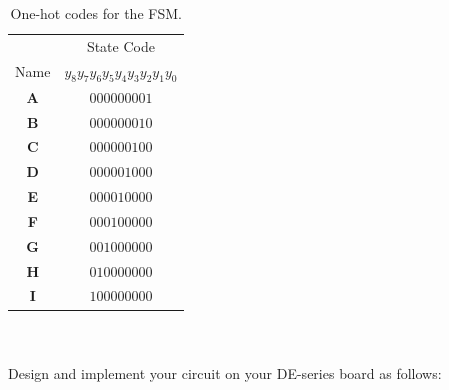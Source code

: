 \documentclass[epsfig,10pt,fullpage]{article}
\begin{document}
\begin{table}[H]
\begin{center}
\begin{tabular}{c|c}
~ & State Code \\ 
Name & $y_8 y_7 y_6 y_5 y_4 y_3 y_2 y_1 y_0$ \\ \hline
\rule[-0.075in]{0in}{0.25in}{\bf A} & $000000001$ \\ 
{\bf B} & $000000010$ \\ 
{\bf C} & $000000100$ \\ 
{\bf D} & $000001000$ \\ 
{\bf E} & $000010000$ \\ 
{\bf F} & $000100000$ \\ 
{\bf G} & $001000000$ \\ 
{\bf H} & $010000000$ \\ 
{\bf I} & $100000000$ \\ 
\end{tabular}
\end{center}
\caption{One-hot codes for the FSM.}
\label{tab:state_assignment}
\end{table}
~\\
~\\
Design and implement your circuit on your DE-series board as follows:
\end{document}
